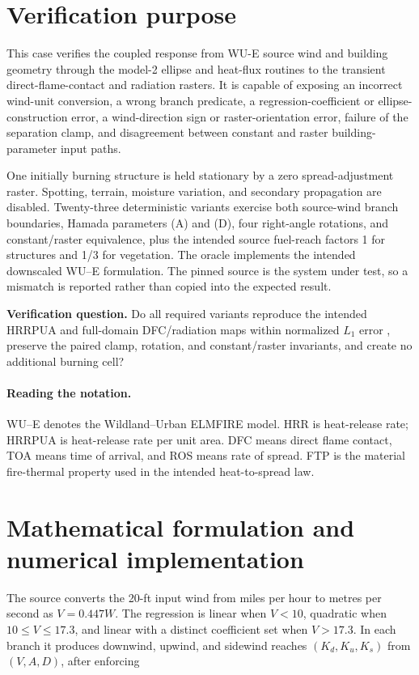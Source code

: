 \section{Verification purpose}

This case verifies the coupled response from WU-E source wind and building
geometry through the model-2 ellipse and heat-flux routines to the
transient direct-flame-contact and radiation rasters.  It is capable of
exposing an incorrect wind-unit conversion, a wrong branch predicate, a
regression-coefficient or ellipse-construction error, a wind-direction sign or
raster-orientation error, failure of the separation clamp, and disagreement
between constant and raster building-parameter input paths.

One initially burning structure is held stationary by a zero spread-adjustment
raster.  Spotting, terrain, moisture variation, and secondary propagation are
disabled. Twenty-three deterministic variants exercise both source-wind branch
boundaries, Hamada parameters (A) and (D), four right-angle rotations, and
constant/raster equivalence, plus the intended source fuel-reach factors 1 for
structures and 1/3 for vegetation. The oracle implements the intended downscaled
WU--E formulation.  The pinned source is the system under test, so a mismatch
is reported rather than copied into the expected result.

\textbf{Verification question.} Do all required variants reproduce the
intended HRRPUA and full-domain DFC/radiation maps within normalized
$L_1$ error \HeatMapTolerance, preserve the paired clamp, rotation, and
constant/raster invariants, and create no additional burning cell?


\paragraph{Reading the notation.}
WU--E denotes the Wildland--Urban ELMFIRE model. HRR is heat-release rate;
HRRPUA is heat-release rate per unit area. DFC means direct flame contact,
TOA means time of arrival, and ROS means rate of spread. FTP is the material
fire-thermal property used in the intended heat-to-spread law.

\ReportOverview

\section{Mathematical formulation and numerical implementation}

The source converts the 20-ft input wind from miles per hour to metres per
second as $V=0.447W$.  The regression is linear when $V<10$, quadratic when
$10\le V\le17.3$, and linear with a distinct coefficient set when
$V>17.3$.  In each branch it produces downwind, upwind, and sidewind reaches
$(K_d,K_u,K_s)$ from $(V,A,D)$, after enforcing

